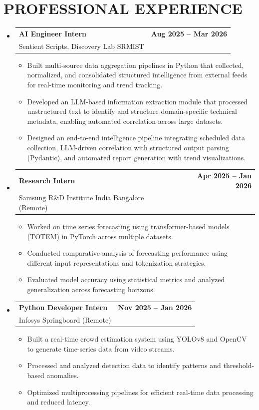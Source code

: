 \documentclass[11pt,letterpaper]{article}
\makeatletter
\newcommand{\resumeSubheading}[4]{
  \vspace{-2pt}
  \item
    \begin{tabular*}{0.97\textwidth}[t]{l@{\extracolsep{\fill}}r}
      \textbf{#1} & \textbf{#2} \\
      #3 & #4 \\
    \end{tabular*}\vspace{-5pt}
}
\makeatother
\begin{document}
\section{PROFESSIONAL EXPERIENCE}
\begin{itemize}[leftmargin=*]

\resumeSubheading
{AI Engineer Intern}{Aug 2025 -- Mar 2026}
{Sentient Scripts, Discovery Lab SRMIST}{}
\begin{itemize}[leftmargin=*]
    \item Built multi-source data aggregation pipelines in Python that collected, normalized, and consolidated structured intelligence from external feeds for real-time monitoring and trend tracking.
    \item Developed an LLM-based information extraction module that processed unstructured text to identify and structure domain-specific technical metadata, enabling automated correlation across large datasets.
    \item Designed an end-to-end intelligence pipeline integrating scheduled data collection, LLM-driven correlation with structured output parsing (Pydantic), and automated report generation with trend visualizations.
\end{itemize}

\resumeSubheading
{Research Intern}{Apr 2025 -- Jan 2026}
{Samsung R\&D Institute India Bangalore (Remote)}{}
\begin{itemize}[leftmargin=*]
    \item Worked on time series forecasting using transformer-based models (TOTEM) in PyTorch across multiple datasets.
    \item Conducted comparative analysis of forecasting performance using different input representations and tokenization strategies.
    \item Evaluated model accuracy using statistical metrics and analyzed generalization across forecasting horizons.
\end{itemize}

\resumeSubheading
{Python Developer Intern}{Nov 2025 -- Jan 2026}
{Infosys Springboard (Remote)}{}
\begin{itemize}[leftmargin=*]
    \item Built a real-time crowd estimation system using YOLOv8 and OpenCV to generate time-series data from video streams.
    \item Processed and analyzed detection data to identify patterns and threshold-based anomalies.
    \item Optimized multiprocessing pipelines for efficient real-time data processing and reduced latency.
\end{itemize}

\end{itemize}
\end{document}
